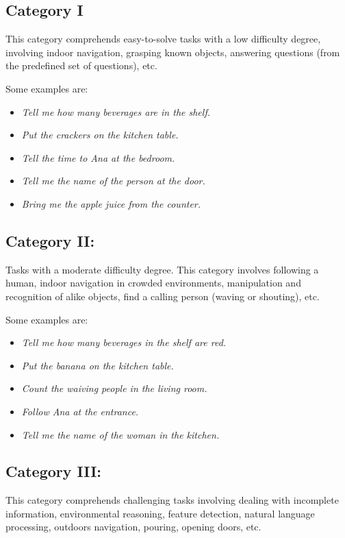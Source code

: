 \subsection{Category I}
\label{chap:gpsr-appendix-cat1}
This category comprehends easy-to-solve tasks with a low difficulty degree, involving indoor navigation, grasping known objects, answering questions (from the predefined set of questions), etc.

Some examples are:
\begin{itemize}
	\item \textit{Tell me how many beverages are in the shelf.}
	\item \textit{Put the crackers on the kitchen table.}
	\item \textit{Tell the time to Ana at the bedroom.}
	\item \textit{Tell me the name of the person at the door.}
	\item \textit{Bring me the apple juice from the counter.}
\end{itemize}

\subsection{Category II:}
\label{chap:gpsr-appendix-cat2}
Tasks with a moderate difficulty degree. This category involves following a human, indoor navigation in crowded environments, manipulation and recognition of alike objects, find a calling person (waving or shouting), etc.

Some examples are:
\begin{itemize}
	\item \textit{Tell me how many beverages in the shelf are red.}
	\item \textit{Put the banana on the kitchen table.}
	\item \textit{Count the waiving people in the living room.}
	\item \textit{Follow Ana at the entrance.}
	\item \textit{Tell me the name of the woman in the kitchen.}
\end{itemize}


\subsection{Category III:}
\label{chap:gpsr-appendix-cat3}
This category comprehends challenging tasks involving dealing with incomplete information, environmental reasoning, feature detection, natural language processing, outdoors navigation, pouring, opening doors, etc.


